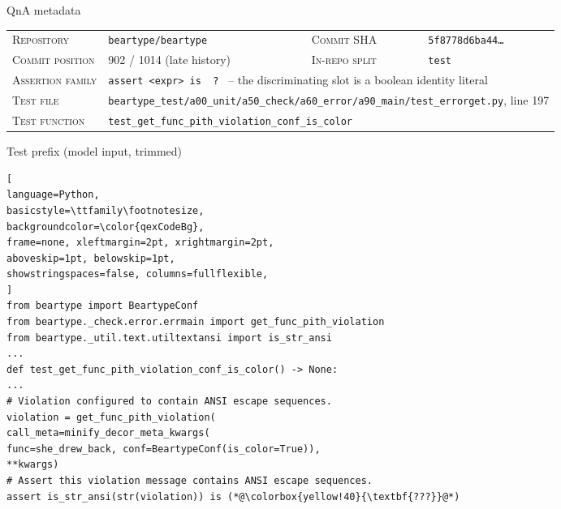 \documentclass[11pt]{article}
\begin{document}
\begin{figure}[!htbp]
\begin{center}
\begin{tcolorbox}[
enhanced,
colback=white, colframe=qexHead, coltitle=white,
fonttitle=\bfseries,
title={Detailed qualitative example: \texttt{beartype/beartype} (IR test, commit-derived)},
arc=3pt, boxrule=0.6pt,
top=3pt, bottom=3pt, left=6pt, right=6pt,
]

\begin{qexsection}{QnA metadata}
\footnotesize
\begin{tabular}{@{}l@{\;\;}l@{\hskip 14pt}l@{\;\;}l@{}}
\textsc{Repository}      & \texttt{beartype/beartype}                  & \textsc{Commit SHA}        & \texttt{5f8778d6ba44\ldots} \\
\textsc{Commit position} & 902 / 1014 (late history)                   & \textsc{In-repo split}     & \texttt{test} \\
\textsc{Assertion family} & \multicolumn{3}{l}{\texttt{assert <expr> is \,?\,} -- the discriminating slot is a boolean identity literal} \\
\textsc{Test file}       & \multicolumn{3}{l}{\texttt{beartype\_test/a00\_unit/a50\_check/a60\_error/a90\_main/test\_errorget.py}, line 197} \\
\textsc{Test function}   & \multicolumn{3}{l}{\texttt{test\_get\_func\_pith\_violation\_conf\_is\_color}} \\
\end{tabular}
\end{qexsection}

\begin{qexsection}{Test prefix (model input, trimmed)}
\begin{lstlisting}[
language=Python,
basicstyle=\ttfamily\footnotesize,
backgroundcolor=\color{qexCodeBg},
frame=none, xleftmargin=2pt, xrightmargin=2pt,
aboveskip=1pt, belowskip=1pt,
showstringspaces=false, columns=fullflexible,
]
from beartype import BeartypeConf
from beartype._check.error.errmain import get_func_pith_violation
from beartype._util.text.utiltextansi import is_str_ansi
...
def test_get_func_pith_violation_conf_is_color() -> None:
...
# Violation configured to contain ANSI escape sequences.
violation = get_func_pith_violation(
call_meta=minify_decor_meta_kwargs(
func=she_drew_back, conf=BeartypeConf(is_color=True)),
**kwargs)
# Assert this violation message contains ANSI escape sequences.
assert is_str_ansi(str(violation)) is (*@\colorbox{yellow!40}{\textbf{???}}@*)
\end{lstlisting}
\end{qexsection}


\end{tcolorbox}
\end{center}
\end{figure}
\end{document}
